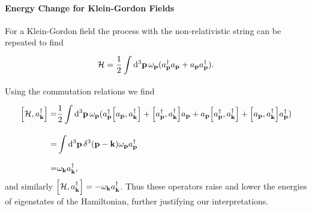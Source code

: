 \paragraph{Energy Change for Klein-Gordon Fields}
For a Klein-Gordon field the process with the non-relativistic string can be repeated to find
\begin{align*}
	\mathcal{H} = \frac{1}{2}\int\limits_{}^{}\dd[3]{\vb{p}}\omega_{\vb{p}}(a_{\vb{p}}^{\dagger} a_{\vb{p}} + a_{\vb{p}}a_{\vb{p}}^{\dagger}).
\end{align*}
Using the commutation relations we find
\begin{align*}
	\comm{\ham}{a_{\vb{k}}\adj} =& \frac{1}{2}\integ[3]{}{}{\vb{p}}{\omega_{\vb{p}}(a_{\vb{p}}\adj\comm{a_{\vb{p}}}{a_{\vb{k}}\adj} + \comm{a_{\vb{p}}\adj}{a_{\vb{k}}\adj}a_{\vb{p}} + a_{\vb{p}}\comm{a_{\vb{p}}\adj}{a_{\vb{k}}\adj} + \comm{a_{\vb{p}}}{a_{\vb{k}}\adj}a_{\vb{p}}\adj)} \\
	                            =& \integ[3]{}{}{\vb{p}}{\delta^{3}(\vb{p} - \vb{k})\omega_{\vb{p}}a_{\vb{p}}\adj} \\
	                            =& \omega_{\vb{k}}a_{\vb{k}}\adj,
\end{align*}
and similarly $\comm{\ham}{a_{\vb{k}}\adj} = -\omega_{\vb{k}}a_{\vb{k}}\adj$. Thus these operators raise and lower the energies of eigenstates of the Hamiltonian, further justifying our interpretations.

